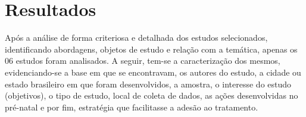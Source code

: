 \chapter{Resultados}
\label{chap:resultados}

Após a análise de forma criteriosa e detalhada dos estudos selecionados, identificando abordagens, objetos de estudo e relação com a temática, apenas os 06 estudos foram analisados. A seguir, tem-se a caracterização dos mesmos, evidenciando-se a base em que se encontravam, os autores do estudo, a cidade ou estado brasileiro em que foram desenvolvidos, a amostra, o interesse do estudo (objetivos), o tipo de estudo, local de coleta de dados, as ações desenvolvidas no pré-natal e por fim, estratégia que facilitasse a adesão ao tratamento.




